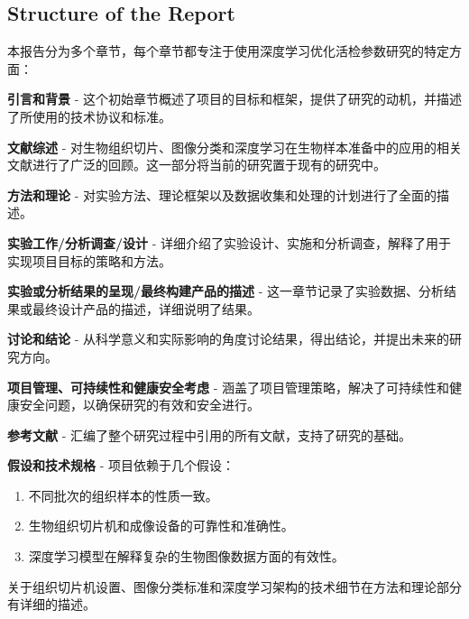 \subsection{Structure of the Report}

本报告分为多个章节，每个章节都专注于使用深度学习优化活检参数研究的特定方面：

\textbf{引言和背景} - 这个初始章节概述了项目的目标和框架，提供了研究的动机，并描述了所使用的技术协议和标准。

\textbf{文献综述} - 对生物组织切片、图像分类和深度学习在生物样本准备中的应用的相关文献进行了广泛的回顾。这一部分将当前的研究置于现有的研究中。

\textbf{方法和理论} - 对实验方法、理论框架以及数据收集和处理的计划进行了全面的描述。

\textbf{实验工作/分析调查/设计} - 详细介绍了实验设计、实施和分析调查，解释了用于实现项目目标的策略和方法。

\textbf{实验或分析结果的呈现/最终构建产品的描述} - 这一章节记录了实验数据、分析结果或最终设计产品的描述，详细说明了结果。

\textbf{讨论和结论} - 从科学意义和实际影响的角度讨论结果，得出结论，并提出未来的研究方向。

\textbf{项目管理、可持续性和健康安全考虑} - 涵盖了项目管理策略，解决了可持续性和健康安全问题，以确保研究的有效和安全进行。

\textbf{参考文献} - 汇编了整个研究过程中引用的所有文献，支持了研究的基础。

\textbf{假设和技术规格} - 项目依赖于几个假设：

\begin{enumerate}
    \item 不同批次的组织样本的性质一致。
    \item 生物组织切片机和成像设备的可靠性和准确性。
    \item 深度学习模型在解释复杂的生物图像数据方面的有效性。
\end{enumerate}

关于组织切片机设置、图像分类标准和深度学习架构的技术细节在方法和理论部分有详细的描述。

